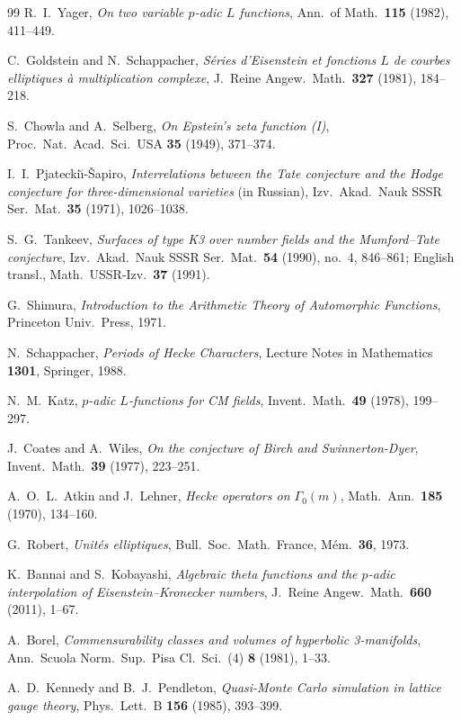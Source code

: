 \documentclass[12pt]{amsart}
\theoremstyle{definition}
\begin{document}
\begin{thebibliography}{99}
  R.~I.~Yager,
  \emph{On two variable $p$-adic $L$ functions},
  Ann.\ of Math.\ \textbf{115} (1982), 411--449.

  C.~Goldstein and N.~Schappacher,
  \emph{S\'eries d'Eisenstein et fonctions $L$ de courbes elliptiques \`a multiplication complexe},
  J.\ Reine Angew.\ Math.\ \textbf{327} (1981), 184--218.

  S.~Chowla and A.~Selberg,
  \emph{On Epstein's zeta function (I)},
  Proc.\ Nat.\ Acad.\ Sci.\ USA \textbf{35} (1949), 371--374.

  I.~I.~Pjatecki\u{\i}-\v{S}apiro,
  \emph{Interrelations between the Tate conjecture and the Hodge conjecture for three-dimensional varieties} (in Russian),
  Izv.\ Akad.\ Nauk SSSR Ser.\ Mat.\ \textbf{35} (1971), 1026--1038.

  S.~G.~Tankeev,
  \emph{Surfaces of type K3 over number fields and the Mumford--Tate conjecture},
  Izv.\ Akad.\ Nauk SSSR Ser.\ Mat.\ \textbf{54} (1990), no.~4, 846--861;
  English transl., Math.\ USSR-Izv.\ \textbf{37} (1991).

  G.~Shimura,
  \emph{Introduction to the Arithmetic Theory of Automorphic Functions},
  Princeton Univ.\ Press, 1971.

  N.~Schappacher,
  \emph{Periods of Hecke Characters},
  Lecture Notes in Mathematics \textbf{1301}, Springer, 1988.

  N.~M.~Katz,
  \emph{$p$-adic $L$-functions for CM fields},
  Invent.\ Math.\ \textbf{49} (1978), 199--297.

  J.~Coates and A.~Wiles,
  \emph{On the conjecture of Birch and Swinnerton-Dyer},
  Invent.\ Math.\ \textbf{39} (1977), 223--251.

  A.~O.~L.~Atkin and J.~Lehner,
  \emph{Hecke operators on $\Gamma_0(m)$},
  Math.\ Ann.\ \textbf{185} (1970), 134--160.

  G.~Robert,
  \emph{Unit\'es elliptiques}, Bull.\ Soc.\ Math.\ France, M\'em.\ \textbf{36}, 1973.

  K.~Bannai and S.~Kobayashi,
  \emph{Algebraic theta functions and the $p$-adic interpolation of Eisenstein--Kronecker numbers},
  J.\ Reine Angew.\ Math.\ \textbf{660} (2011), 1--67.

  A.~Borel,
  \emph{Commensurability classes and volumes of hyperbolic 3-manifolds},
  Ann.\ Scuola Norm.\ Sup.\ Pisa Cl.\ Sci.\ (4) \textbf{8} (1981), 1--33.

  A.~D.~Kennedy and B.~J.~Pendleton,
  \emph{Quasi-Monte Carlo simulation in lattice gauge theory},
  Phys.\ Lett.\ B \textbf{156} (1985), 393--399.

\end{thebibliography}
\end{document}
